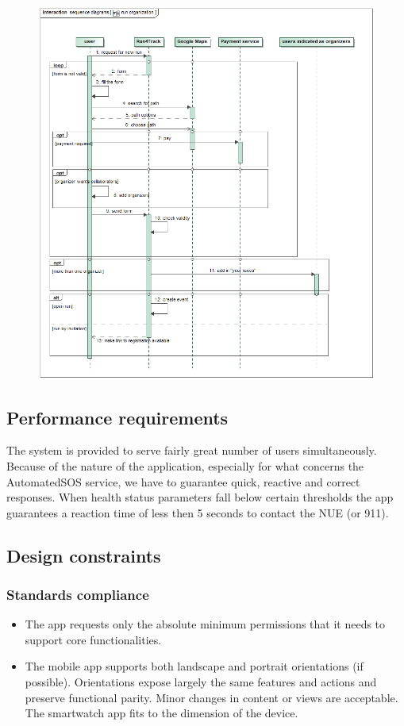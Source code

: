 \begin{figure}[h!] \ContinuedFloat
\centering
\includegraphics[scale=0.5]{sections/diagrams/run_organization.png} \newline
{}
\end{figure}
\clearpage

\subsection{Performance requirements}
The system is provided to serve fairly great number of users simultaneously. Because of the nature of the application, especially for what concerns the AutomatedSOS service, we have to guarantee quick, reactive and correct responses. When health status parameters fall below certain thresholds the app guarantees a reaction time of less then 5 seconds to contact the NUE (or 911).

\subsection{Design constraints}
\subsubsection{Standards compliance}
\begin{itemize}
\item The app requests only the absolute minimum permissions that it needs to support core functionalities.
\item The mobile app supports both landscape and portrait orientations (if possible). Orientations expose largely the same features and actions and preserve functional parity. Minor changes in content
or views are acceptable. The smartwatch app fits to the dimension of the device.
\end{itemize}

